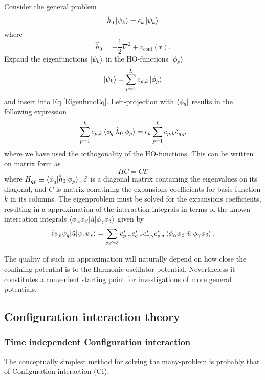 \documentclass[a4paper,10pt, twocolumn]{article}
\begin{document}
Consider the general problem
\begin{equation}
 \hat{h}_0 \ket{\psi_k} = \epsilon_k \ket{\psi_k} \label{EigenfuncEq}
\end{equation}
where 
\begin{equation}
 \hat{h}_0 = -\frac{1}{2}\nabla^2 + v_{\text{conf}}(\mathbf{r}).
\end{equation}
Expand the eigenfunctions $\ket{\psi_k}$ in the HO-functions $\ket{\phi_p}$
\begin{equation}
 \ket{\psi_k} = \sum_{p=1}^L c_{p,k} \ket{\phi_p} 
\end{equation}
and insert into Eq.\eqref{EigenfuncEq}. Left-projection with $\bra{\phi_q}$ results in the following expression
\begin{equation}
 \sum_{p=1}^L c_{p,k} \braket{\phi_q|\hat{h}_0|\phi_p} = \epsilon_k \sum_{p=1}^L c_{p,k} \delta_{q,p}
\end{equation}
where we have used the orthogonality of the HO-functions. This can be written on matrix form as 
\begin{equation}
 HC = C\mathcal{E}
\end{equation}
where $H_{qp} \equiv \braket{\phi_q|\hat{h}_0|\phi_p}$, $\mathcal{E}$ is a diagonal matrix containing the eigenvalues on its diagonal, and $C$ is matrix conatining 
the expansions coefficients for basis function $k$ in its columns. The eigenproblem must be solved for the expansions coefficients, resulting in a approximation of the interaction integrals 
in terms of the known intercation integrals $\braket{\phi_\alpha \phi_\beta|\hat{u}|\phi_\gamma \phi_\delta}$ given by 
\begin{equation}
 \braket{\psi_p \psi_q| \hat{u}| \psi_r \psi_s} = \sum_{\alpha \beta \gamma \delta} c^*_{p,\alpha} c^*_{q,\beta} c^*_{r,\gamma} c^*_{s,\delta} \braket{\phi_\alpha \phi_\beta|\hat{u}|\phi_\gamma \phi_\delta}.
\end{equation}

The quality of such an approximation will naturally depend on how close the confining potential is to the Harmonic oscillator potential. Nevertheless it constitutes a convenient starting point for 
investigations of more general potentials.

\subsection{Configuration interaction theory}

\subsubsection{Time independent Configuration interaction}
The conceptually simplest method for solving the many-problem is probably that of Configuration interaction (CI). 
\end{document}
